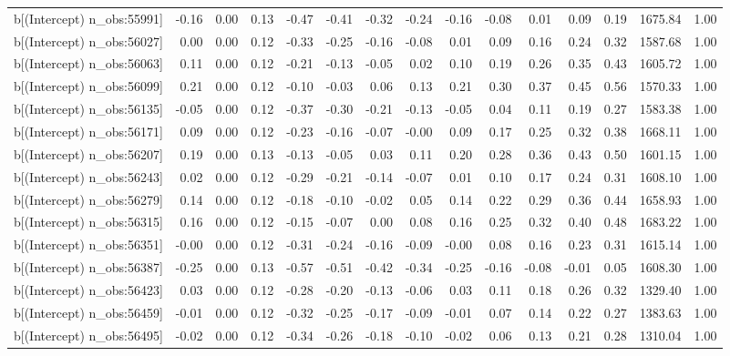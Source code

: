 \begin{table}[ht]
\begin{tabular}{rrrrrrrrrrrrrrr}
  b[(Intercept) n\_obs:55991] & -0.16 & 0.00 & 0.13 & -0.47 & -0.41 & -0.32 & -0.24 & -0.16 & -0.08 & 0.01 & 0.09 & 0.19 & 1675.84 & 1.00 \\ 
  b[(Intercept) n\_obs:56027] & 0.00 & 0.00 & 0.12 & -0.33 & -0.25 & -0.16 & -0.08 & 0.01 & 0.09 & 0.16 & 0.24 & 0.32 & 1587.68 & 1.00 \\ 
  b[(Intercept) n\_obs:56063] & 0.11 & 0.00 & 0.12 & -0.21 & -0.13 & -0.05 & 0.02 & 0.10 & 0.19 & 0.26 & 0.35 & 0.43 & 1605.72 & 1.00 \\ 
  b[(Intercept) n\_obs:56099] & 0.21 & 0.00 & 0.12 & -0.10 & -0.03 & 0.06 & 0.13 & 0.21 & 0.30 & 0.37 & 0.45 & 0.56 & 1570.33 & 1.00 \\ 
  b[(Intercept) n\_obs:56135] & -0.05 & 0.00 & 0.12 & -0.37 & -0.30 & -0.21 & -0.13 & -0.05 & 0.04 & 0.11 & 0.19 & 0.27 & 1583.38 & 1.00 \\ 
  b[(Intercept) n\_obs:56171] & 0.09 & 0.00 & 0.12 & -0.23 & -0.16 & -0.07 & -0.00 & 0.09 & 0.17 & 0.25 & 0.32 & 0.38 & 1668.11 & 1.00 \\ 
  b[(Intercept) n\_obs:56207] & 0.19 & 0.00 & 0.13 & -0.13 & -0.05 & 0.03 & 0.11 & 0.20 & 0.28 & 0.36 & 0.43 & 0.50 & 1601.15 & 1.00 \\ 
  b[(Intercept) n\_obs:56243] & 0.02 & 0.00 & 0.12 & -0.29 & -0.21 & -0.14 & -0.07 & 0.01 & 0.10 & 0.17 & 0.24 & 0.31 & 1608.10 & 1.00 \\ 
  b[(Intercept) n\_obs:56279] & 0.14 & 0.00 & 0.12 & -0.18 & -0.10 & -0.02 & 0.05 & 0.14 & 0.22 & 0.29 & 0.36 & 0.44 & 1658.93 & 1.00 \\ 
  b[(Intercept) n\_obs:56315] & 0.16 & 0.00 & 0.12 & -0.15 & -0.07 & 0.00 & 0.08 & 0.16 & 0.25 & 0.32 & 0.40 & 0.48 & 1683.22 & 1.00 \\ 
  b[(Intercept) n\_obs:56351] & -0.00 & 0.00 & 0.12 & -0.31 & -0.24 & -0.16 & -0.09 & -0.00 & 0.08 & 0.16 & 0.23 & 0.31 & 1615.14 & 1.00 \\ 
  b[(Intercept) n\_obs:56387] & -0.25 & 0.00 & 0.13 & -0.57 & -0.51 & -0.42 & -0.34 & -0.25 & -0.16 & -0.08 & -0.01 & 0.05 & 1608.30 & 1.00 \\ 
  b[(Intercept) n\_obs:56423] & 0.03 & 0.00 & 0.12 & -0.28 & -0.20 & -0.13 & -0.06 & 0.03 & 0.11 & 0.18 & 0.26 & 0.32 & 1329.40 & 1.00 \\ 
  b[(Intercept) n\_obs:56459] & -0.01 & 0.00 & 0.12 & -0.32 & -0.25 & -0.17 & -0.09 & -0.01 & 0.07 & 0.14 & 0.22 & 0.27 & 1383.63 & 1.00 \\ 
  b[(Intercept) n\_obs:56495] & -0.02 & 0.00 & 0.12 & -0.34 & -0.26 & -0.18 & -0.10 & -0.02 & 0.06 & 0.13 & 0.21 & 0.28 & 1310.04 & 1.00 \\ 

\end{tabular}
\end{table}
